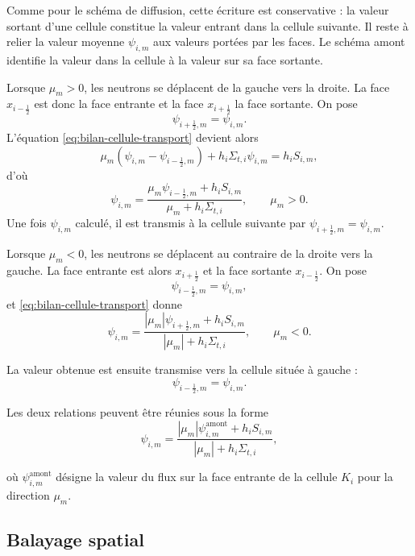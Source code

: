 \documentclass{article}
\begin{document}
Comme pour le schéma de diffusion, cette écriture est conservative : la valeur sortant d'une cellule constitue la valeur entrant dans la cellule suivante. Il reste à relier la valeur moyenne $\psi_{i,m}$ aux valeurs portées par les faces. Le schéma amont identifie la valeur dans la cellule à la valeur sur sa face sortante.

Lorsque $\mu_m>0$, les neutrons se déplacent de la gauche vers la droite. La face $x_{i-\frac12}$ est donc la face entrante et la face $x_{i+\frac12}$ la face sortante. On pose
\[
    \psi_{i+\frac12,m}=\psi_{i,m}.
\]
L'équation \eqref{eq:bilan-cellule-transport} devient alors
\[
\mu_m \left( \psi_{i,m}-\psi_{i-\frac12,m} \right) + h_i\Sigma_{t,i}\psi_{i,m}
= h_iS_{i,m},
\]
d'où
\begin{equation}
    \boxed{
        \psi_{i,m} = \frac{ \mu_m\psi_{i-\frac12,m} + h_iS_{i,m}}
        {\mu_m+h_i\Sigma_{t,i}},
        \qquad \mu_m>0.
    }
    \label{eq:upwind-positif}
\end{equation}
Une fois $\psi_{i,m}$ calculé, il est transmis à la cellule suivante par $\psi_{i+\frac12,m}=\psi_{i,m}.$

Lorsque $\mu_m<0$, les neutrons se déplacent au contraire de la droite vers la gauche. La face entrante est alors $x_{i+\frac12}$ et la face sortante $x_{i-\frac12}$. On pose
\[
    \psi_{i-\frac12,m}=\psi_{i,m},
\]
et \eqref{eq:bilan-cellule-transport} donne
\begin{equation}
\boxed{
    \psi_{i,m} = \frac{ |\mu_m|\psi_{i+\frac12,m}+ h_iS_{i,m}}
    {|\mu_m|+h_i\Sigma_{t,i}},
    \qquad \mu_m<0.
}
\label{eq:upwind-negatif}
\end{equation}

La valeur obtenue est ensuite transmise vers la cellule située à gauche :
\[
    \psi_{i-\frac12,m}=\psi_{i,m}.
\]

Les deux relations peuvent être réunies sous la forme
\begin{equation}
\boxed{\psi_{i,m} =
    \frac{ |\mu_m|\psi_{i,m}^{\mathrm{amont}} + h_iS_{i,m}}
    {|\mu_m|+h_i\Sigma_{t,i}},}
\label{eq:upwind-forme-generale}
\end{equation}

où $\psi_{i,m}^{\mathrm{amont}}$ désigne la valeur du flux sur la face entrante de la cellule $K_i$ pour la direction $\mu_m$.

\subsection {Balayage spatial}
\end{document}
